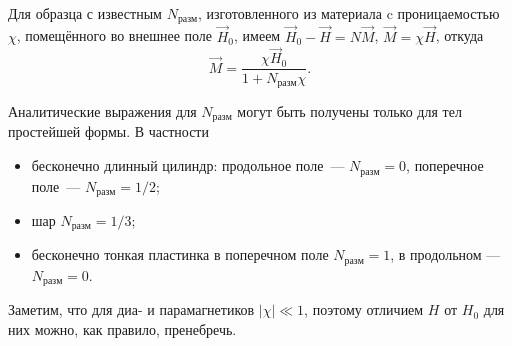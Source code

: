 Для образца с известным $N_{разм}$, изготовленного из материала
c проницаемостью $\chi$, помещённого во внешнее поле $\vec{H}_0$, имеем
$\vec{H}_0 - \vec{H} = N \vec{M}$, $\vec{M}=\chi \vec{H}$, откуда
\begin{equation}
\vec{M} = \frac{\chi \vec{H}_0}{1+N_{разм}\chi}.
\end{equation}

Аналитические выражения для $N_{разм}$ могут быть получены только для тел
простейшей формы. В частности
\begin{itemize}
    \item бесконечно длинный цилиндр: продольное поле~--- $N_{разм} = 0$,
          поперечное поле~--- $N_{разм} = 1/2$;
    \item шар $N_{разм} = 1/3$;
    \item бесконечно тонкая пластинка в поперечном поле $N_{разм} = 1$,
          в продольном --- $N_{разм} = 0$.
\end{itemize}

Заметим, что для диа- и парамагнетиков $|\chi|\ll 1$, поэтому отличием $H$ от
$H_0$ для них можно, как правило, пренебречь.


